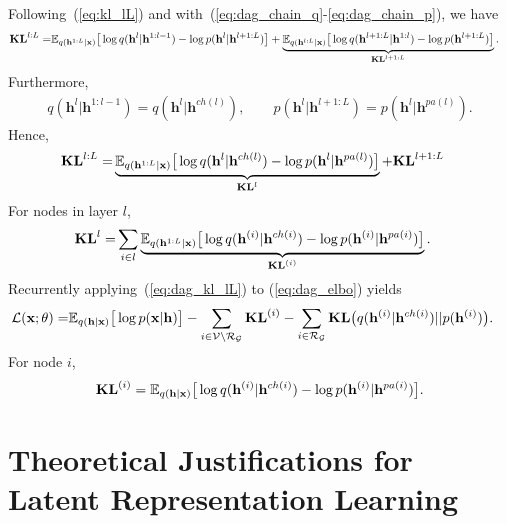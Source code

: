 \documentclass[twoside]{article}
\begin{document}
Following~(\ref{eq:kl_lL}) and with~(\ref{eq:dag_chain_q}-\ref{eq:dag_chain_p}), we have 
 \begin{align} \notag
\textbf{\text{KL}}^{l:L} 
=&  \mathbb{E}_{q(\mathbf{h}^{1:L}|\mathbf{x})}\big[  \log q(\mathbf{h}^{l}|\mathbf{h}^{1:l-1})   - \log p(\mathbf{h}^{l}|\mathbf{h}^{l+1:L}) \big] + \underbrace{\mathbb{E}_{q(\mathbf{h}^{l:L}|\mathbf{x})}\big[  \log q(\mathbf{h}^{l+1:L}|\mathbf{h}^{1:l})- \log p(\mathbf{h}^{l+1:L})  \big]}_{\mathbf{KL}^{l+1:L}}.
\end{align}
Furthermore,
\begin{align*} 
q(\mathbf{h}^{l}|\mathbf{h}^{1:l-1})=q(\mathbf{h}^{l}|\mathbf{h}^{ch(l)}), \quad  \quad   p(\mathbf{h}^{l}|\mathbf{h}^{l+1:L}) = p(\mathbf{h}^{l}|\mathbf{h}^{pa(l)}).
\end{align*}
Hence,
 \begin{align} \label{eq:dag_kl_lL}
\textbf{\text{KL}}^{l:L} 
=&  \underbrace{\mathbb{E}_{q(\mathbf{h}^{1:L}|\mathbf{x})}\big[ \log q(\mathbf{h}^{l}|\mathbf{h}^{ch(l)})  - \log p(\mathbf{h}^{l}|\mathbf{h}^{pa(l)}) \big]}_{\textbf{\text{KL}}^{l}} +\textbf{\text{KL}}^{l+1:L} 
\end{align}
For nodes in layer $l$,
\begin{align} \notag
\textbf{\text{KL}}^{l} =& \sum_{i \in l} \underbrace{\mathbb{E}_{q(\mathbf{h}^{1:L}|\mathbf{x})}\big[  \log q(\mathbf{h}^{(i)}|\mathbf{h}^{ch(i)})  - \log p(\mathbf{h}^{(i)}|\mathbf{h}^{pa(i)}) \big]}_{\textbf{\text{KL}}^{(i)}} .
\end{align}
Recurrently applying~(\ref{eq:dag_kl_lL}) to (\ref{eq:dag_elbo}) yields
\begin{align}\notag %
\mathcal{L}(\mathbf{x}; \theta) =& \mathbb{E}_{q(\mathbf{h}|\mathbf{x})}\big[ \log p(\mathbf{x}|\mathbf{h})  \big] -  \sum_{i \in \mathcal{V}  \setminus  \mathcal{R}_{ \mathcal{G} }} \textbf{\text{KL}}^{(i)} -    \sum_{i \in  \mathcal{R}_{ \mathcal{G} }  }  \textbf{\text{KL}}\big(q(\mathbf{h}^{(i)} | \mathbf{h}^{ch(i)} )   || p(\mathbf{h}^{(i)})  \big) .
\end{align}
For node $i$, 
$$\textbf{\text{KL}}^{(i)} = \mathbb{E}_{q(\mathbf{h}|\mathbf{x})}\big[  \log q(\mathbf{h}^{(i)}|\mathbf{h}^{ch(i)})  - \log p(\mathbf{h}^{(i)}|\mathbf{h}^{pa(i)}) \big].$$



\section{Theoretical Justifications for Latent Representation Learning}\label{sec:repr_theory}
\end{document}
